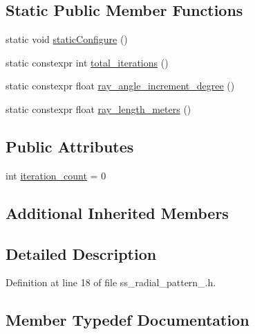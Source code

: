 \subsection*{Static Public Member Functions}
\begin{DoxyCompactItemize}
\item 
static void \hyperlink{structsm__dance__bot__3_1_1SS2_1_1SsRadialPattern2_af03f7d05eae72e178e01c38a0d478019}{static\+Configure} ()
\item 
static constexpr int \hyperlink{structsm__dance__bot__3_1_1SS2_1_1SsRadialPattern2_a5a4bca7f5c511a2b358f920c715fbdec}{total\+\_\+iterations} ()
\item 
static constexpr float \hyperlink{structsm__dance__bot__3_1_1SS2_1_1SsRadialPattern2_a3cb389428cdef48301135b562077f6aa}{ray\+\_\+angle\+\_\+increment\+\_\+degree} ()
\item 
static constexpr float \hyperlink{structsm__dance__bot__3_1_1SS2_1_1SsRadialPattern2_aad26eba03d611cdd4f842c2cf0eab644}{ray\+\_\+length\+\_\+meters} ()
\end{DoxyCompactItemize}
\subsection*{Public Attributes}
\begin{DoxyCompactItemize}
\item 
int \hyperlink{structsm__dance__bot__3_1_1SS2_1_1SsRadialPattern2_ae214d5caeae81f505b2b41e4d6427cd3}{iteration\+\_\+count} = 0
\end{DoxyCompactItemize}
\subsection*{Additional Inherited Members}


\subsection{Detailed Description}


Definition at line 18 of file ss\+\_\+radial\+\_\+pattern\+\_.\+h.



\subsection{Member Typedef Documentation}
